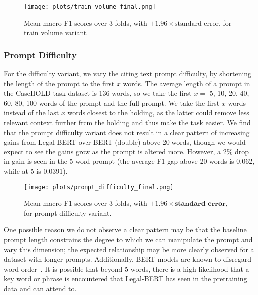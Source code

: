 \documentclass[sigconf]{acmart}
\begin{document}
\begin{figure}
    \centering
    \texttt{[image: plots/train\_volume\_final.png]}
    \vspace{-0.15in}
    \caption{Mean macro F1 scores over 3 folds, with $\pm 1.96 \times \text{standard error}$, for train volume variant.}
    \label{fig:trainvolume}
    \vspace{-0.15in}
\end{figure}

\subsubsection{Prompt Difficulty}
For the difficulty variant, we vary the citing text prompt difficulty, by shortening the length of the prompt to the first $x$ words. The average length of a prompt in the CaseHOLD task dataset is 136 words, so we take the first $x =$ 5, 10, 20, 40, 60, 80, 100 words of the prompt and the full prompt.  We take the first $x$ words instead of the last $x$ words closest to the holding, as the latter could remove less relevant context further from the holding and thus make the task easier. We find that the prompt difficulty variant does not result in a clear pattern of increasing gains from Legal-BERT over BERT (double) above 20 words, though we would expect to see the gains grow as the prompt is altered more. However, a 2\% drop in gain is seen in the 5 word prompt (the average F1 gap above 20 words is 0.062, while at 5 is 0.0391).

\begin{figure}
    \centering
    \texttt{[image: plots/prompt\_difficulty\_final.png]}
    \vspace{-0.15in}
    \caption{Mean macro F1 scores over 3 folds, with $\pm1.96 \times \textbf{standard error}$, for prompt difficulty variant.}
    \label{fig:promptdifficulty}
    \vspace{-0.15in}
\end{figure}

One possible reason we do not observe a clear pattern may be that the baseline prompt length  constrains the degree to which we can manipulate the prompt and vary this dimension; the expected relationship may be more clearly observed for a dataset with longer prompts. Additionally, BERT models are known to disregard word order~\cite{sinha2020unnatural}. It is possible that beyond 5 words, there is a high likelihood that a key word or phrase is encountered that Legal-BERT has seen in the pretraining data and can attend to.
\end{document}
